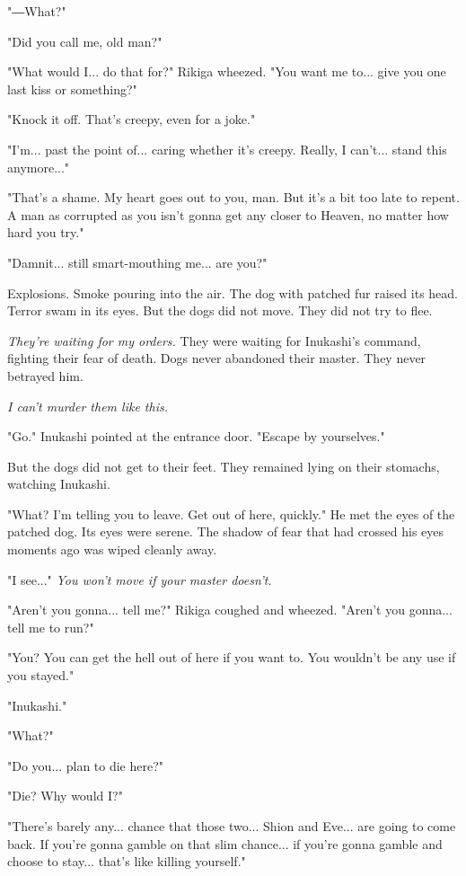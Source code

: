 "―What?"

"Did you call me, old man?"

"What would I... do that for?" Rikiga wheezed. "You want me to... give
you one last kiss or something?"

"Knock it off. That's creepy, even for a joke."

"I'm... past the point of... caring whether it's creepy. Really, I
can't... stand this anymore..."

"That's a shame. My heart goes out to you, man. But it's a bit too late
to repent. A man as corrupted as you isn't gonna get any closer to
Heaven, no matter how hard you try."

"Damnit... still smart-mouthing me... are you?"

Explosions. Smoke pouring into the air. The dog with patched fur raised
its head. Terror swam in its eyes. But the dogs did not move. They did
not try to flee.

\emph{They're waiting for my orders.} They were waiting for Inukashi's command,
fighting their fear of death. Dogs never abandoned their master. They
never betrayed him.

\emph{I can't murder them like this.}

"Go." Inukashi pointed at the entrance door. "Escape by yourselves."

But the dogs did not get to their feet. They remained lying on their
stomachs, watching Inukashi.

"What? I'm telling you to leave. Get out of here, quickly." He met the
eyes of the patched dog. Its eyes were serene. The shadow of fear that
had crossed his eyes moments ago was wiped cleanly away.

"I see..." \emph{You won't move if your master doesn't.}

"Aren't you gonna... tell me?" Rikiga coughed and wheezed. "Aren't you
gonna... tell me to run?"

"You? You can get the hell out of here if you want to. You wouldn't be
any use if you stayed."

"Inukashi."

"What?"

"Do you... plan to die here?"

"Die? Why would I?"

"There's barely any... chance that those two... Shion and Eve... are
going to come back. If you're gonna gamble on that slim chance... if
you're gonna gamble and choose to stay... that's like killing yourself."


